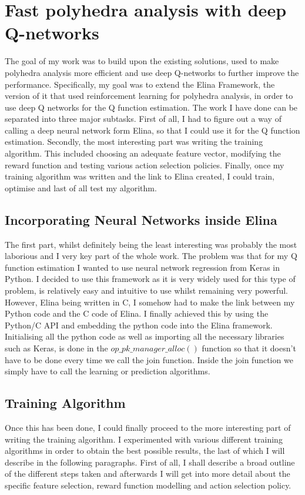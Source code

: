 
\chapter{Fast polyhedra analysis with deep Q-networks}

The goal of my work was to build upon the existing solutions, used to make polyhedra analysis more efficient and use deep Q-networks to further improve the performance. Specifically, my goal was to extend the Elina Framework, the version of it that used reinforcement learning for polyhedra analysis, in order to use deep Q networks for the Q function estimation. The work I have done can be separated into three major subtasks. First of all, I had to figure out a way of calling a deep neural network form Elina, so that I could use it for the Q function estimation. Secondly, the most interesting part was writing the training algorithm. This included choosing an adequate feature vector, modifying the reward function and testing various action selection policies. Finally, once my training algorithm was written and the link to Elina created, I could train, optimise and last of all test my algorithm. 
\section{Incorporating Neural Networks inside Elina}
The first part, whilst definitely being the least interesting was probably the most laborious and I very key part of the whole work. The problem was that for my Q function estimation I wanted to use neural network regression from Keras in Python. I decided to use this framework as it is very widely used for this type of problem, is relatively easy and intuitive to use whilst remaining very powerful. However, Elina being written in C, I somehow had to make the link between my Python code and the C code of Elina. I finally achieved this by using the Python/C API and embedding the python code into the Elina framework. Initialising all the python code as well as importing all the necessary libraries such as Keras, is done in the $op\_pk\_manager\_alloc()$ function so that it doesn't have to be done every time we call the join function. Inside the join function we simply have to call the learning or prediction algorithms.
\section{Training Algorithm}
Once this has been done, I could finally proceed to the more interesting part of writing the training algorithm. I experimented with various different training algorithms in order to obtain the best possible results, the last of which I will describe in the following paragraphs. First of all, I shall describe a broad outline of the different steps taken and afterwards I will get into more detail about the specific feature selection, reward function modelling and action selection policy.
